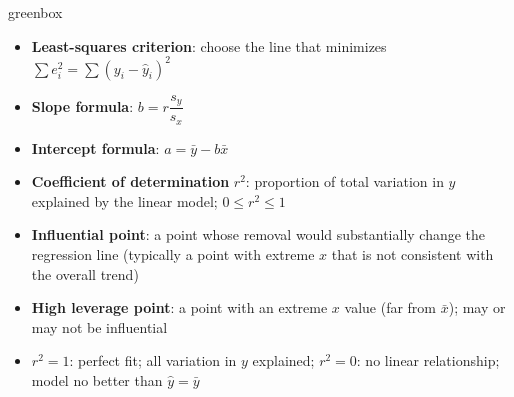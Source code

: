 \documentclass[10pt]{article}
\begin{document}
\begin{skillbox}{greenbox}
\begin{minipage}[t]{0.48\linewidth}
    \begin{itemize}
        \item \textbf{Least-squares criterion}: choose the line that minimizes $\sum e_i^2 = \sum(y_i - \hat{y}_i)^2$
        \item \textbf{Slope formula}: $b = r\dfrac{s_y}{s_x}$
        \item \textbf{Intercept formula}: $a = \bar{y} - b\bar{x}$
        \item \textbf{Coefficient of determination} $r^2$: proportion of total variation in $y$ explained by the linear model; $0 \leq r^2 \leq 1$
    \end{itemize}
\end{minipage}
\hfill
\begin{minipage}[t]{0.48\linewidth}
    \begin{itemize}
        \item \textbf{Influential point}: a point whose removal would substantially change the regression line (typically a point with extreme $x$ that is not consistent with the overall trend)
        \item \textbf{High leverage point}: a point with an extreme $x$ value (far from $\bar{x}$); may or may not be influential
        \item \textbf{$r^2 = 1$}: perfect fit; all variation in $y$ explained; \textbf{$r^2 = 0$}: no linear relationship; model no better than $\hat{y} = \bar{y}$
    \end{itemize}
\end{minipage}
\end{skillbox}
\end{document}
